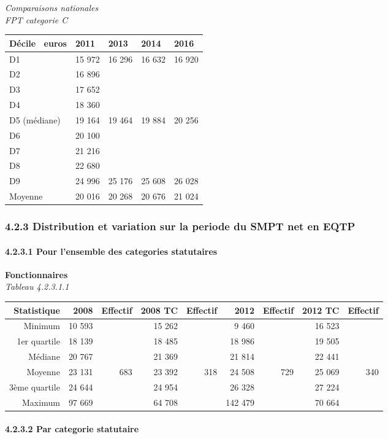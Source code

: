 \emph{Comparaisons nationales}\\
\emph{FPT categorie C}

\begin{longtable}[]{@{}lllll@{}}
\toprule
Décile ~euros & 2011 & 2013 & 2014 & 2016\tabularnewline
\midrule
\endhead
D1 & 15 972 & 16 296 & 16 632 & 16 920\tabularnewline
D2 & 16 896 & & &\tabularnewline
D3 & 17 652 & & &\tabularnewline
D4 & 18 360 & & &\tabularnewline
D5 (médiane) & 19 164 & 19 464 & 19 884 & 20 256\tabularnewline
D6 & 20 100 & & &\tabularnewline
D7 & 21 216 & & &\tabularnewline
D8 & 22 680 & & &\tabularnewline
D9 & 24 996 & 25 176 & 25 608 & 26 028\tabularnewline
Moyenne & 20 016 & 20 268 & 20 676 & 21 024\tabularnewline
\bottomrule
\end{longtable}

\hypertarget{distribution-et-variation-sur-la-periode-du-smpt-net-en-eqtp}{%
\subsubsection{4.2.3 Distribution et variation sur la periode du SMPT
net en
EQTP}\label{distribution-et-variation-sur-la-periode-du-smpt-net-en-eqtp}}

\hypertarget{pour-lensemble-des-categories-statutaires}{%
\paragraph{4.2.3.1 Pour l'ensemble des categories
statutaires}\label{pour-lensemble-des-categories-statutaires}}

\textbf{Fonctionnaires}\\
\hspace*{0.333em}\emph{Tableau 4.2.3.1.1}

\begin{longtable}[]{@{}rrrrrrrrr@{}}
\toprule
Statistique & 2008 & Effectif & 2008 TC & Effectif & 2012 & Effectif &
2012 TC & Effectif\tabularnewline
\midrule
\endhead
Minimum & 10 593 & & 15 262 & & 9 460 & & 16 523 &\tabularnewline
1er quartile & 18 139 & & 18 485 & & 18 986 & & 19 505 &\tabularnewline
Médiane & 20 767 & & 21 369 & & 21 814 & & 22 441 &\tabularnewline
Moyenne & 23 131 & 683 & 23 392 & 318 & 24 508 & 729 & 25 069 &
340\tabularnewline
3ème quartile & 24 644 & & 24 954 & & 26 328 & & 27 224 &\tabularnewline
Maximum & 97 669 & & 64 708 & & 142 479 & & 70 664 &\tabularnewline
\bottomrule
\end{longtable}

\hypertarget{par-categorie-statutaire-1}{%
\paragraph{4.2.3.2 Par categorie
statutaire}\label{par-categorie-statutaire-1}}

